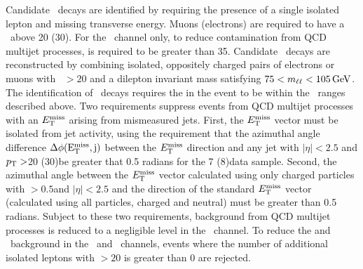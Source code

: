 \documentclass[12pt,twoside,a4paper,cmspaper,final,collab]{cms-tdr}
\begin{document}
Candidate \WtoLN\ decays are identified by requiring
the presence of a single isolated lepton and missing
transverse energy. Muons (electrons) are required to have a \pt\ above
20 (30)\GeV.  %
For the
\WenH\ channel only, to reduce contamination from QCD multijet
processes,
\MET is required to be greater than 35\GeV.
Candidate \ZtoLL\ decays are reconstructed by combining
isolated, oppositely charged pairs of electrons or muons with  \pt\ $> 20$\GeV
and a dilepton invariant
mass satisfying $75<m_{\ell\ell}<105\,\text{Ge\hspace{-.08em}V}$.  The identification of \ZtoNN\ decays
requires the \MET in the event to be within the \ptV\ ranges
described above.
Two requirements suppress events from QCD multijet processes
with an $E_{\mathrm{T}}^{\text{miss}}$ arising from mismeasured jets.
First, the $E_{\mathrm{T}}^{\text{miss}}$ vector must be isolated from jet activity, using
the requirement that the azimuthal angle difference $\Delta\phi(\mathrm{E_{\mathrm{T}}^{\text{miss}},j})$ between
the  $E_{\mathrm{T}}^{\text{miss}}$ direction and any jet with $|\eta|<2.5$ and $p_{\mathrm{T}}>$20
(30)\GeV  be greater that 0.5 radians for the 7 (8)\TeV data sample.
Second, the azimuthal angle between the
$E_{\mathrm{T}}^{\text{miss}}$ vector
calculated using only charged particles with \pt$>0.5$\GeV and $\left |
  \eta \right |<2.5$ and the direction of the standard $E_{\mathrm{T}}^{\text{miss}}$ vector (calculated using all particles, charged
and neutral) must be greater than 0.5 radians.
Subject to these two requirements, background from QCD multijet processes
is reduced to a negligible level in the \ZnnH\ channel.
To reduce the \ttbar and \WZ\ background in the \WH\ and \ZnnH\ channels,
events where the number of additional isolated leptons with \pt$>20$\GeV %
is greater than 0  are rejected.
\end{document}
